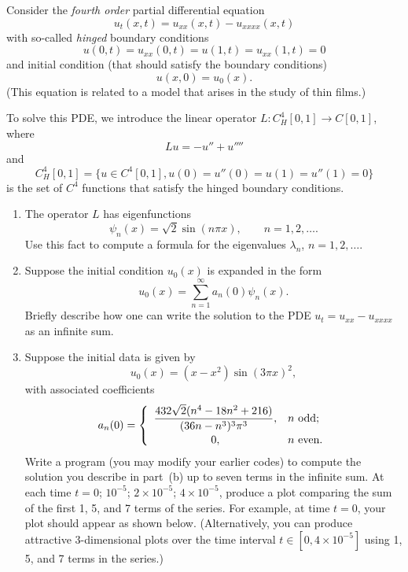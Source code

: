 Consider the \emph{fourth order} partial differential equation
\[ u_t(x,t) = u_{xx}(x,t) - u_{xxxx}(x,t)\]
with so-called \emph{hinged} boundary conditions
\[ u(0,t) = u_{xx}(0,t) = u(1,t) = u_{xx}(1,t) = 0\]
and initial condition (that should satisfy the boundary conditions)
\[ u(x,0) = u_0(x).\]
(This equation is related to a model that arises in the study of thin films.)

      To solve this PDE, we introduce the linear
      operator $L: C^4_H[0,1] \to C[0,1]$, where 
      \[ Lu = -u'' + u''''\]
      and 
     \[ C^4_H[0,1] = \{ u \in C^4[0,1], u(0)=u''(0)=u(1)=u''(1)=0\}\]
      is the set of $C^4$ functions that satisfy the hinged boundary conditions.

\begin{enumerate}
\item The operator $L$ has eigenfunctions 
       \[ \psi_n(x) = \sqrt{2} \sin(n \pi x), \qquad n=1, 2, \ldots.\]
      Use this fact to compute a formula for the eigenvalues $\lambda_n$,
       $n=1,2, \ldots.$
    
\item Suppose the initial condition $u_0(x)$ is expanded in the form
      \[ u_0(x) = \sum_{n=1}^\infty a_n(0) \psi_n(x).\]
      Briefly describe how one can write the solution to the 
      PDE $u_t = u_{xx}-u_{xxxx}$ as an infinite sum.

\item Suppose the initial data is given by
\[ u_0(x) = (x-x^2) \sin(3\pi x)^2,\]
with associated coefficients
\[ a_n(0) = \left\{ \begin{array}{cl} 
      \displaystyle{{432\sqrt{2} (n^4-18n^2 + 216) \over (36n-n^3)^3 \pi^3}}, & \mbox{$n$ odd}; \\[.75em]
      0, & \mbox{$n$ even}.
\end{array}\right. \]
Write a program (you may modify your earlier codes) to compute the
solution you describe in part~(b) up to seven terms in the infinite sum.
At each time $t=0$; $10^{-5}$; $2\times 10^{-5}$; $4 \times 10^{-5}$, produce a plot comparing
the sum of the first 1, 5, and 7 terms of the series.
For example, at time $t=0$, your plot should appear as shown below.
(Alternatively, you can produce attractive 3-dimensional plots over the time interval
$t\in [0, 4\times10^{-5}]$ using 1, 5, and 7 terms in the series.)



\end{enumerate}

